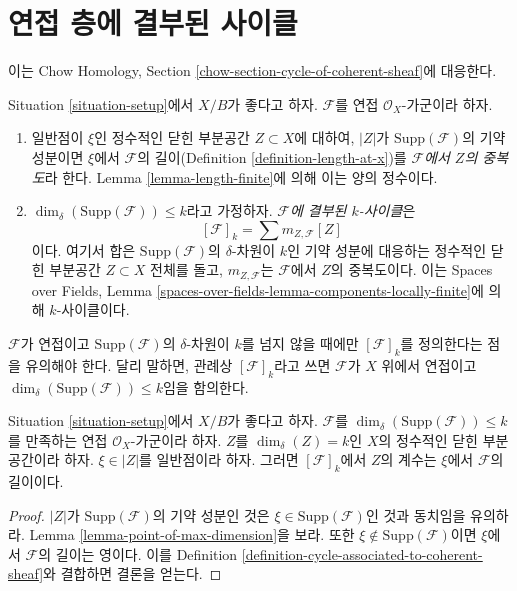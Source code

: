 \section{연접 층에 결부된 사이클}
\label{section-cycle-of-coherent-sheaf}

\noindent
이는 Chow Homology, Section
\ref{chow-section-cycle-of-coherent-sheaf}에 대응한다.

\begin{definition}
\label{definition-cycle-associated-to-coherent-sheaf}
Situation \ref{situation-setup}에서 $X/B$가 좋다고 하자.
$\mathcal{F}$를 연접 $\mathcal{O}_X$-가군이라 하자.
\begin{enumerate}
\item 일반점이 $\xi$인 정수적인 닫힌 부분공간 $Z \subset X$에 대하여,
$|Z|$가 $\text{Supp}(\mathcal{F})$의 기약 성분이면 $\xi$에서
$\mathcal{F}$의 길이(Definition \ref{definition-length-at-x})를
{\it $\mathcal{F}$에서 $Z$의 중복도}라 한다.
Lemma \ref{lemma-length-finite}에 의해 이는 양의 정수이다.
\item $\dim_\delta(\text{Supp}(\mathcal{F})) \leq k$라고 가정하자.
{\it $\mathcal{F}$에 결부된 $k$-사이클}은
$$
[\mathcal{F}]_k = \sum m_{Z, \mathcal{F}}[Z]
$$
이다. 여기서 합은 $\text{Supp}(\mathcal{F})$의 $\delta$-차원이 $k$인
기약 성분에 대응하는 정수적인 닫힌 부분공간 $Z \subset X$ 전체를 돌고,
$m_{Z, \mathcal{F}}$는 $\mathcal{F}$에서 $Z$의 중복도이다.
이는 Spaces over Fields, Lemma
\ref{spaces-over-fields-lemma-components-locally-finite}에 의해
$k$-사이클이다.
\end{enumerate}
\end{definition}

\noindent
$\mathcal{F}$가 연접이고 $\text{Supp}(\mathcal{F})$의 $\delta$-차원이
$k$를 넘지 않을 때에만 $[\mathcal{F}]_k$를 정의한다는 점을 유의해야 한다.
달리 말하면, 관례상 $[\mathcal{F}]_k$라고 쓰면 $\mathcal{F}$가
$X$ 위에서 연접이고
$\dim_\delta(\text{Supp}(\mathcal{F})) \leq k$임을 함의한다.

\begin{lemma}
\label{lemma-reformulate-coeff-coherent}
Situation \ref{situation-setup}에서 $X/B$가 좋다고 하자.
$\mathcal{F}$를 $\dim_\delta(\text{Supp}(\mathcal{F})) \leq k$를 만족하는
연접 $\mathcal{O}_X$-가군이라 하자.
$Z$를 $\dim_\delta(Z) = k$인 $X$의 정수적인 닫힌 부분공간이라 하자.
$\xi \in |Z|$를 일반점이라 하자. 그러면 $[\mathcal{F}]_k$에서
$Z$의 계수는 $\xi$에서 $\mathcal{F}$의 길이이다.
\end{lemma}

\begin{proof}
$|Z|$가 $\text{Supp}(\mathcal{F})$의 기약 성분인 것은
$\xi \in \text{Supp}(\mathcal{F})$인 것과 동치임을 유의하라.
Lemma \ref{lemma-point-of-max-dimension}을 보라. 또한
$\xi \not \in \text{Supp}(\mathcal{F})$이면 $\xi$에서
$\mathcal{F}$의 길이는 영이다. 이를 Definition
\ref{definition-cycle-associated-to-coherent-sheaf}와 결합하면 결론을 얻는다.
\end{proof}

